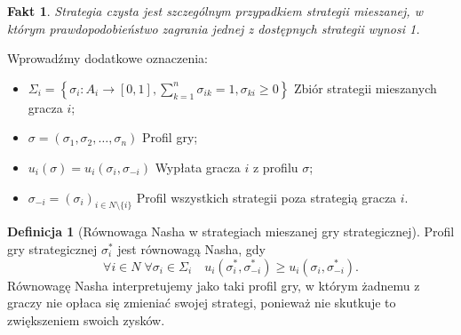 \documentclass[inzynierska]{pwr_wmat_praca_dyplomowa}
\theoremstyle{plain}
\numberwithin{theorem}{chapter}
\newtheorem{fact}[theorem]{Fakt}
\theoremstyle{definition}
\numberwithin{theorem}{chapter}
\newtheorem{definition}[theorem]{Definicja}
\begin{document}
	\begin{fact}
		Strategia czysta jest szczególnym przypadkiem strategii mieszanej, w którym prawdopodobieństwo zagrania jednej z dostępnych strategii wynosi 1.
	\end{fact}
	Wprowadźmy dodatkowe oznaczenia:
 	\begin{itemize}
 		\item $\Sigma_i  = \left\{ \sigma_i: A_i \rightarrow [0, 1], \sum_{k=1}^{n} \sigma_{ik} = 1,  \sigma_{ki}\ge 0 \right\}$ \pauza Zbiór strategii mieszanych gracza $i$;
 		\item  $\sigma = (\sigma_1, \sigma_2, \dots, \sigma_n)$ \pauza Profil gry;
 		\item $u_i(\sigma) = u_i(\sigma_i, \sigma_{-i})$ \pauza Wypłata gracza $i$ z profilu $\sigma$;
 		\item $\sigma_{-i} = (\sigma_i)_{i\in N \setminus \{i\}}$ \pauza Profil wszystkich strategii poza strategią gracza $i$. 
 	\end{itemize}
	\begin{definition}[Równowaga Nasha w strategiach mieszanej gry strategicznej]
		Profil gry strategicznej $\sigma_i^*$ jest równowagą Nasha, gdy
		\begin{equation*}
			\mathop{\forall}{i \in N}\;
			\mathop{\forall}{\sigma_i \in \Sigma_i} \quad
			u_i(\sigma_i^*, \sigma_{-i}^*) \ge u_i(\sigma_i,  \sigma_{-i}^*).
		\end{equation*}
	Równowagę Nasha interpretujemy jako taki profil gry, w którym żadnemu z graczy nie opłaca się zmieniać swojej strategi, ponieważ nie skutkuje to zwiększeniem swoich zysków.
	\end{definition}
\end{document}
